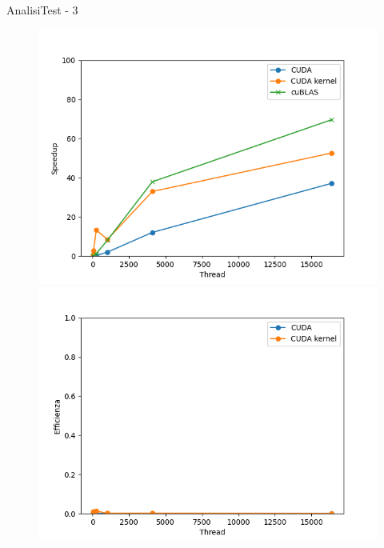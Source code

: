\begin{frame}{Analisi}{Test - 3}
    \begin{figure}[H]
        \centering
        \begin{minipage}{0.49\textwidth}
            \includegraphics[width=\textwidth]{./imgs/graphs/caso_c_speedup.png}
        \end{minipage}
        \begin{minipage}{0.49\textwidth}
            \includegraphics[width=\textwidth]{./imgs/graphs/caso_c_efficiency.png}
        \end{minipage}
    \end{figure}
\end{frame}

